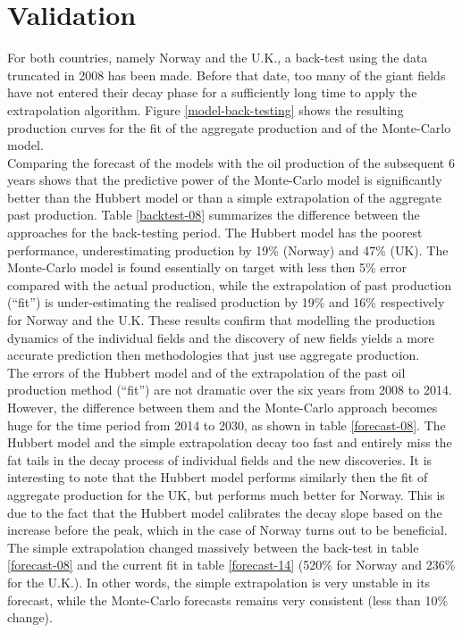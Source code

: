 \documentclass[review]{elsarticle}
\begin{document}
\section{Validation}

For both countries, namely Norway and the U.K., a back-test using
the data truncated in 2008 has been made. Before that date, too many
of the giant fields have not entered their decay phase for a sufficiently
long time to apply the extrapolation algorithm. Figure \ref{model-back-testing}
shows the resulting production curves for the fit of the aggregate production and of the Monte-Carlo model.\\
Comparing the forecast of the models with the oil production of the subsequent 6 years shows that the predictive power of the Monte-Carlo model is significantly better than the Hubbert model or than a simple extrapolation of the aggregate past production. Table \ref{backtest-08} summarizes the difference between the approaches for the back-testing period. The Hubbert model has the poorest performance, underestimating production by 19\% (Norway) and 47\% (UK). The Monte-Carlo model is found essentially on target with less then 5\% error compared with the actual production, while the extrapolation of past production (``fit'') is under-estimating the realised production by 19\% and 16\% respectively for Norway and the U.K. These results confirm that modelling the production dynamics of the individual fields and the discovery of new fields yields a more accurate prediction then methodologies that just use aggregate production.\\
The errors of the Hubbert model and of the extrapolation of the past oil production method (``fit'') are not dramatic over the six years from 2008 to 2014. However, the difference between them and the Monte-Carlo approach becomes huge for the time period from 2014 to 2030, as shown in table \ref{forecast-08}. The Hubbert model and the simple extrapolation decay too fast and entirely miss the fat tails in the decay process of individual fields and the new discoveries. It is interesting to note that the Hubbert model performs similarly then the fit of aggregate production for the UK, but performs much better for Norway. This is due to the fact that the Hubbert model calibrates the decay slope based on the increase before the peak, which in the case of Norway turns out to be beneficial.\\
The simple extrapolation changed massively between the back-test in table \ref{forecast-08} and the current fit in table \ref{forecast-14} (520\% for Norway and 236\% for the U.K.). In other words, the simple extrapolation is very unstable in its forecast, while the Monte-Carlo forecasts remains very consistent (less than 10\% change).\\
\end{document}
